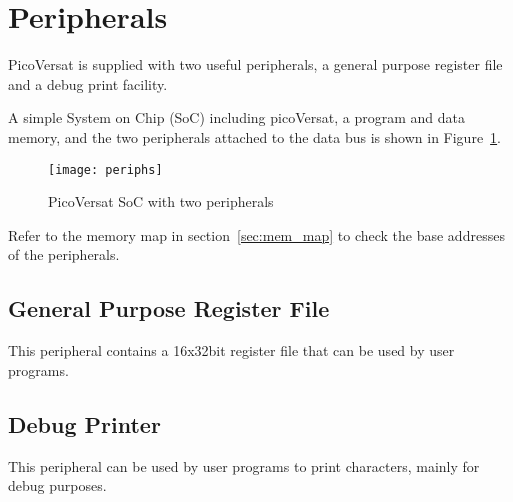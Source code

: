 \section{Peripherals}
\label{sec:periphs}

PicoVersat is supplied with two useful peripherals, a general purpose register
file and a debug print facility.

A simple System on Chip
(SoC) including picoVersat, a program and data memory, and the two peripherals
attached to the data bus is shown in Figure~\ref{fig:periphs}.

\begin{figure}[!htbp]
    \centerline{\texttt{[image: periphs]}}
    \vspace{0cm}\caption{PicoVersat SoC with two peripherals}
    \label{fig:periphs}
\end{figure}

Refer to the memory map in section~\ref{sec:mem_map} to check the base addresses
of the peripherals.

\subsection{General Purpose Register File}

This peripheral contains a 16x32bit register file that can be used by user
programs. 

\subsection{Debug Printer}

This peripheral can be used by user programs to print characters, mainly for
debug purposes.
